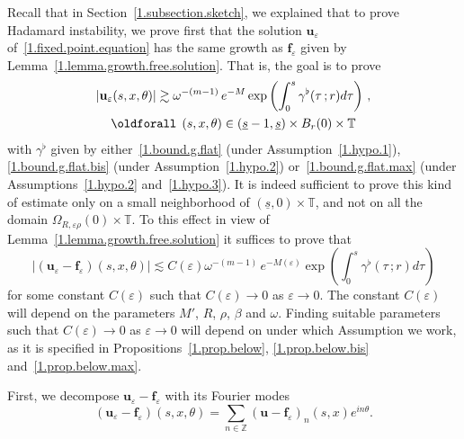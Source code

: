 \documentclass[AHL,Unicode,longabstracts,published]{cedram}
\theoremstyle{plain}
\newcommand*\e{\varepsilon}
\newcommand*\Z{{\mathbb Z}}
\newcommand*\g{\gamma}
\newcommand{\ubf}{{\mathbf u}}
\newcommand*\f{{\mathbf f}}
\newcommand*\und{\underline}
\renewcommand*{\forall}{\mathrel{\oldforall}}
\begin{document}
Recall that in Section~\ref{1.subsection.sketch}, we explained that to prove Hadamard instability, we prove first that the solution $\ubf_{\e}$ of~\eqref{1.fixed.point.equation} has the same growth as $\f_{\e}$ given by Lemma~\ref{1.lemma.growth.free.solution}. That is, the goal is to prove
\begin{multline}\label{1.growth.solution}
|\ubf_{\e}(s,x,\theta)| \gtrsim \omega^{-(m-1)}\,e^{-M} \exp \left(\int_{0}^{s} \g^{\flat}(\tau \,;r) d\tau \right)\,,\\
\forall\,(s,x,\theta) \in (\und{s} - 1, \und{s})\times B_{r}(0) \times\mathbb{T}
\end{multline}
with $\g^{\flat}$ given by either~\eqref{1.bound.g.flat} (under Assumption~\ref{1.hypo.1}), \eqref{1.bound.g.flat.bis} (under Assumption~\ref{1.hypo.2}) or~\eqref{1.bound.g.flat.max} (under Assumptions~\ref{1.hypo.2} and~\ref{1.hypo.3}). It is indeed sufficient to prove this kind of estimate only on a small neighborhood of $(\und{s},0)\times\mathbb{T}$, and not on all the domain $\Omega_{R,\e\rho}(0)\times\mathbb{T} $. To this effect in view of Lemma~\ref{1.lemma.growth.free.solution} it suffices to prove that
\begin{equation}\label{1.esti.Ceps}
|(\ubf_{\e}-\f_{\e})(s,x,\theta)| \lesssim C(\e)\omega^{-(m-1)}\,e^{-M(\e)} \exp \left(\int_{0}^{s} \g^{\flat}(\tau \,;r) d\tau \right)
\end{equation}
for some constant $C(\e)$ such that $C(\e) \to 0$ as $\e \to 0$. The constant $C(\e)$ will depend on the parameters $M'$, $R$, $\rho$, $\beta$ and $\omega$. Finding suitable parameters such that $C(\e) \to 0$ as $\e \to 0$ will depend on under which Assumption we work, as it is specified in Propositions~\ref{1.prop.below}, \ref{1.prop.below.bis} and~\ref{1.prop.below.max}.

First, we decompose $\ubf_{\e}-\f_{\e}$ with its Fourier modes
\[
(\ubf_{\e}-\f_{\e})(s,x,\theta) = \sum_{n\in\Z} (\ubf-\f_{\e})_n(s,x) e^{in\theta}.
\]
\end{document}
